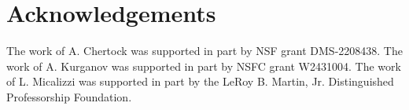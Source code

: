\documentclass[preprint,12pt]{elsarticle}
\begin{document}
\section*{Acknowledgements}
	The work of A. Chertock was supported in part by NSF grant DMS-2208438. The work of A. Kurganov was supported in part by NSFC grant
	W2431004. The work of L. Micalizzi was supported in part by the LeRoy B. Martin, Jr. Distinguished Professorship Foundation.


 




%
%
%
\end{document}
